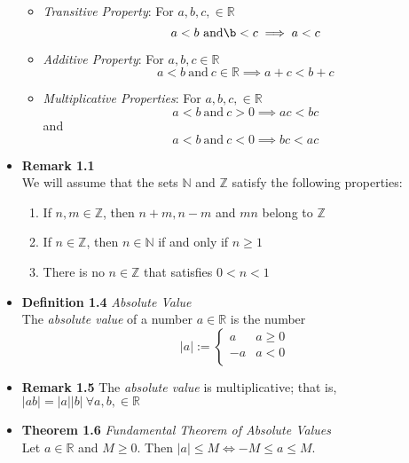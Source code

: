 \documentclass[11pt,a4paper]{article}
\begin{document}
\begin{itemize}
\begin{itemize}
            \item \emph{Transitive Property}:
                For $a, b, c, \in \mathbb{R}$
                \[
                    a < b \ \text{and} \b < c \implies a < c
                \]

            \item \emph{Additive Property}:
                For $a, b, c \in \mathbb{R}$
                \[
                    a < b \ \text{and} \ c \in \mathbb{R} \implies a + c < b + c
                \]

            \item \emph{Multiplicative Properties}:
                For $a, b, c, \in \mathbb{R}$
                \[
                    a < b \ \text{and} \ c > 0 \implies ac < bc
                \]
                and
                \[
                    a < b \ \text{and} \ c < 0 \implies bc < ac
                \]
        \end{itemize}

    \item \textbf{Remark 1.1} \\
        We will assume that the sets $\mathbb{N}$ and $\mathbb{Z}$ satisfy the following properties:
        \begin{enumerate}
            \item If $n, m \in \mathbb{Z}$, then $n + m, n - m$ and $mn$ belong to $\mathbb{Z}$
            \item If $n \in \mathbb{Z}$, then $n \in \mathbb{N}$ if and only if $n \geq 1$
            \item There is no $n \in \mathbb{Z}$ that satisfies $0 < n < 1$
        \end{enumerate}

    \item \textbf{Definition 1.4} \emph{Absolute Value} \\
        The \emph{absolute value} of a number $a \in \mathbb{R}$ is the number
        \[
            |a| :=
            \begin{cases}{}
                a  & a \geq 0 \\
                -a & a < 0 \\
            \end{cases}
        \]

    \item \textbf{Remark 1.5} The \emph{absolute value} is multiplicative;
        that is, $|ab| = |a||b| \ \forall a, b, \in \mathbb{R}$

    \item \textbf{Theorem 1.6} \emph{Fundamental Theorem of Absolute Values} \\
        Let $a \in \mathbb{R}$ and $M \geq 0$.
        Then $|a| \leq M \iff -M \leq a \leq M$.


\end{itemize}
\end{document}
